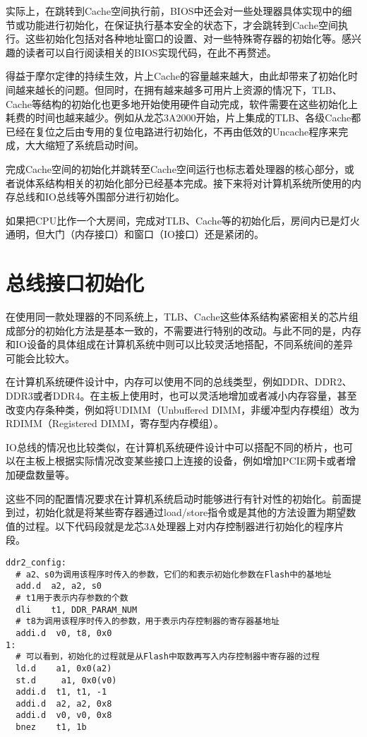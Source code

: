 \documentclass[]{ctexbook}
\begin{document}
实际上，在跳转到Cache空间执行前，BIOS中还会对一些处理器具体实现中的细节或功能进行初始化，在保证执行基本安全的状态下，才会跳转到Cache空间执行。这些初始化包括对各种地址窗口的设置、对一些特殊寄存器的初始化等。感兴趣的读者可以自行阅读相关的BIOS实现代码，在此不再赘述。

得益于摩尔定律的持续生效，片上Cache的容量越来越大，由此却带来了初始化时间越来越长的问题。但同时，在拥有越来越多可用片上资源的情况下，TLB、Cache等结构的初始化也更多地开始使用硬件自动完成，软件需要在这些初始化上耗费的时间也越来越少。例如从龙芯3A2000开始，片上集成的TLB、各级Cache都已经在复位之后由专用的复位电路进行初始化，不再由低效的Uncache程序来完成，大大缩短了系统启动时间。

完成Cache空间的初始化并跳转至Cache空间运行也标志着处理器的核心部分，或者说体系结构相关的初始化部分已经基本完成。接下来将对计算机系统所使用的内存总线和IO总线等外围部分进行初始化。

如果把CPU比作一个大房间，完成对TLB、Cache等的初始化后，房间内已是灯火通明，但大门（内存接口）和窗口（IO接口）还是紧闭的。

\hypertarget{ux603bux7ebfux63a5ux53e3ux521dux59cbux5316}{%
\section{总线接口初始化}\label{ux603bux7ebfux63a5ux53e3ux521dux59cbux5316}}

在使用同一款处理器的不同系统上，TLB、Cache这些体系结构紧密相关的芯片组成部分的初始化方法是基本一致的，不需要进行特别的改动。与此不同的是，内存和IO设备的具体组成在计算机系统中则可以比较灵活地搭配，不同系统间的差异可能会比较大。

在计算机系统硬件设计中，内存可以使用不同的总线类型，例如DDR、DDR2、DDR3或者DDR4。在主板上使用时，也可以灵活地增加或者减小内存容量，甚至改变内存条种类，例如将UDIMM（Unbuffered DIMM，非缓冲型内存模组）改为RDIMM（Registered DIMM，寄存型内存模组）。

IO总线的情况也比较类似，在计算机系统硬件设计中可以搭配不同的桥片，也可以在主板上根据实际情况改变某些接口上连接的设备，例如增加PCIE网卡或者增加硬盘数量等。

这些不同的配置情况要求在计算机系统启动时能够进行有针对性的初始化。前面提到过，初始化就是将某些寄存器通过load/store指令或是其他的方法设置为期望数值的过程。以下代码段就是龙芯3A处理器上对内存控制器进行初始化的程序片段。

\begin{verbatim}
ddr2_config:
  # a2、s0为调用该程序时传入的参数，它们的和表示初始化参数在Flash中的基地址
  add.d  a2, a2, s0
  # t1用于表示内存参数的个数
  dli    t1, DDR_PARAM_NUM
  # t8为调用该程序时传入的参数，用于表示内存控制器的寄存器基地址
  addi.d  v0, t8, 0x0
1:
  # 可以看到，初始化的过程就是从Flash中取数再写入内存控制器中寄存器的过程
  ld.d    a1, 0x0(a2)
  st.d     a1, 0x0(v0)
  addi.d  t1, t1, -1
  addi.d  a2, a2, 0x8
  addi.d  v0, v0, 0x8
  bnez    t1, 1b
\end{verbatim}
\end{document}
